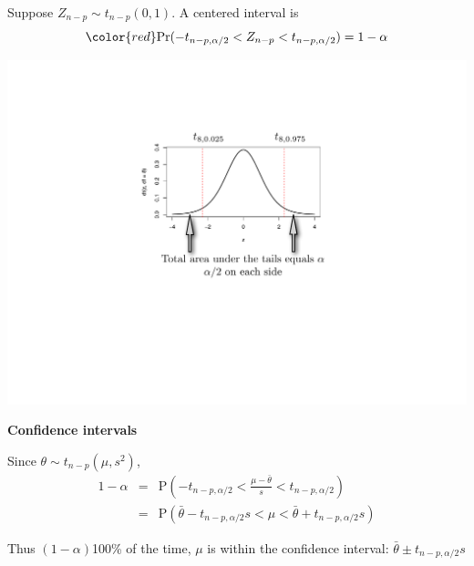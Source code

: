 \documentclass[12pt,xcolor=svgnames]{beamer}
\newcommand{\rd}{\color{red}}
\newcommand{\bl}{\color{blue}}
\newcommand{\theme}{\color{FireBrick}}
\newcommand{\mr}[1]{\mathrm{#1}}
\newcommand{\sk}{\vspace{.4cm}}
\newcommand{\nochap}{\vspace{0.5cm}}
\newcommand{\nsk}{\vspace{-.4cm}}
\newcommand{\chap}[1]{{\theme \Large \bf #1} \sk}
\begin{document}
\begin{frame}
\nochap

Suppose $Z_{n-p} \sim t_{n-p}(0,1)$.  A centered interval is\\
\nsk
\[
\rd \mr{Pr}(-t_{n-p,\alpha/2} < Z_{n-p} < t_{n-p,\alpha/2}) = 1-\alpha
\]
\nsk

\begin{center}
\includegraphics[scale=0.55,trim=20 0 0 15]{tails_new}
\end{center}
\end{frame}

\begin{frame}
\chap{Confidence intervals}

\sk
Since $\theta \sim t_{n-p}(\mu, s^2)$, 
\begin{eqnarray*}
1-\alpha& = &\mr{P}\left(-t_{n-p,\alpha/2} < \frac{\mu - \bar{\theta}}{s} <
t_{n-p,\alpha/2}\right) \\
&=&
\mr{P}(\bar{\theta}-t_{n-p,\alpha/2}s < \mu <
\bar{\theta} + t_{n-p,\alpha/2}s) 
\end{eqnarray*}

\sk
{\bl Thus $(1-\alpha)${\small *100\%} of the time, $\mu$ is
within the confidence interval:} {\rd $\displaystyle
\bar{\theta} \pm t_{n-p,\alpha/2} s$}


\end{frame}
\end{document}
